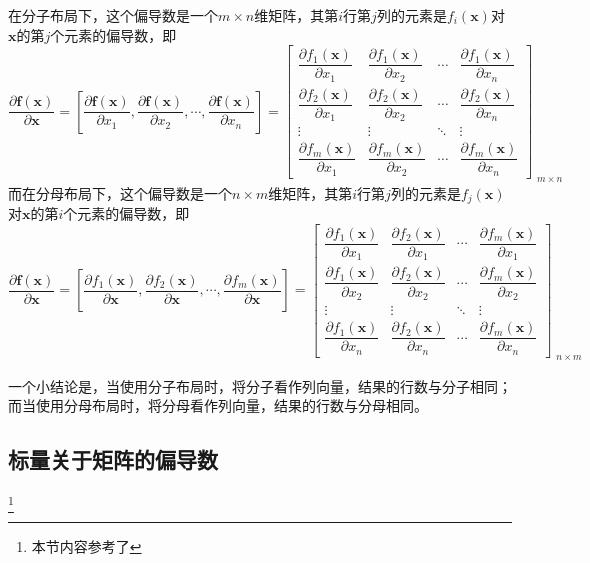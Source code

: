 在分子布局下，这个偏导数是一个$m\times n$维矩阵，其第$i$行第$j$列的元素是$f_i(\bm{x})$对$\bm{x}$的第$j$个元素的偏导数，即
\begin{equation}
	\frac{\partial \bm{f}(\bm{x})}{\partial \bm{x}}
	=\left[\frac{\partial \bm{f}(\bm{x})}{\partial x_1},\frac{\partial \bm{f}(\bm{x})}{\partial x_2},\cdots,\frac{\partial \bm{f}(\bm{x})}{\partial x_n}\right]
	=\begin{bmatrix}
		\dfrac{\partial f_1(\bm{x})}{\partial x_1}&\dfrac{\partial f_1(\bm{x})}{\partial x_2}&\cdots&\dfrac{\partial f_1(\bm{x})}{\partial x_n}\\[2ex]
		\dfrac{\partial f_2(\bm{x})}{\partial x_1}&\dfrac{\partial f_2(\bm{x})}{\partial x_2}&\cdots&\dfrac{\partial f_2(\bm{x})}{\partial x_n}\\[2ex]
		\vdots&\vdots&\ddots&\vdots\\[2ex]
		\dfrac{\partial f_m(\bm{x})}{\partial x_1}&\dfrac{\partial f_m(\bm{x})}{\partial x_2}&\cdots&\dfrac{\partial f_m(\bm{x})}{\partial x_n}
	\end{bmatrix}_{\substack{\scriptstyle m\times n}}
\end{equation}
而在分母布局下，这个偏导数是一个$n\times m$维矩阵，其第$i$行第$j$列的元素是$f_j(\bm{x})$对$\bm{x}$的第$i$个元素的偏导数，即
\begin{equation}
	\frac{\partial \bm{f}(\bm{x})}{\partial \bm{x}}
	=\left[\frac{\partial f_1(\bm{x})}{\partial \bm{x}},\frac{\partial f_2(\bm{x})}{\partial \bm{x}},\cdots,\frac{\partial f_m(\bm{x})}{\partial \bm{x}}\right]
	=\begin{bmatrix}
		\dfrac{\partial f_1(\bm{x})}{\partial x_1}&\dfrac{\partial f_2(\bm{x})}{\partial x_1}&\cdots&\dfrac{\partial f_m(\bm{x})}{\partial x_1}\\[2ex]
		\dfrac{\partial f_1(\bm{x})}{\partial x_2}&\dfrac{\partial f_2(\bm{x})}{\partial x_2}&\cdots&\dfrac{\partial f_m(\bm{x})}{\partial x_2}\\[2ex]
		\vdots&\vdots&\ddots&\vdots\\[2ex]
		\dfrac{\partial f_1(\bm{x})}{\partial x_n}&\dfrac{\partial f_2(\bm{x})}{\partial x_n}&\cdots&\dfrac{\partial f_m(\bm{x})}{\partial x_n}
	\end{bmatrix}_{\substack{\scriptstyle n\times m}}
\end{equation}

一个小结论是，当使用分子布局时，将分子看作列向量，结果的行数与分子相同；而当使用分母布局时，将分母看作列向量，结果的行数与分母相同。

\subsection{标量关于矩阵的偏导数}
\footnote{本节内容参考了\cite{matrix_derivative}}

